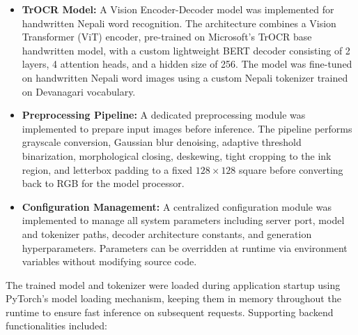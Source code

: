 \begin{itemize}
    \item \textbf{TrOCR Model:} A Vision Encoder-Decoder model was 
    implemented for handwritten Nepali word recognition. The architecture 
    combines a Vision Transformer (ViT) encoder, pre-trained on Microsoft's 
    TrOCR base handwritten model, with a custom lightweight BERT decoder 
    consisting of 2 layers, 4 attention heads, and a hidden size of 256. 
    The model was fine-tuned on handwritten Nepali word images using a 
    custom Nepali tokenizer trained on Devanagari vocabulary.
    
    \item \textbf{Preprocessing Pipeline:} A dedicated preprocessing module 
    was implemented to prepare input images before inference. The pipeline 
    performs grayscale conversion, Gaussian blur denoising, adaptive 
    threshold binarization, morphological closing, deskewing, tight cropping 
    to the ink region, and letterbox padding to a fixed $128 \times 128$ 
    square before converting back to RGB for the model processor.
    
    \item \textbf{Configuration Management:} A centralized configuration 
    module was implemented to manage all system parameters including server 
    port, model and tokenizer paths, decoder architecture constants, and 
    generation hyperparameters. Parameters can be overridden at runtime via 
    environment variables without modifying source code.
\end{itemize}

The trained model and tokenizer were loaded during application startup using 
PyTorch's model loading mechanism, keeping them in memory throughout the 
runtime to ensure fast inference on subsequent requests. Supporting backend 
functionalities included:

